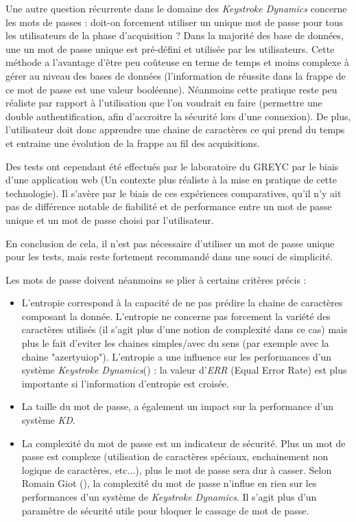 Une autre question récurrente dans le domaine des \textit{Keystroke Dynamics} concerne les mots de passes : doit-on forcement utiliser un unique mot de passe pour tous les utilisateurs de la phase d'acquisition ? Dans la majorité des base de données, une un mot de passe unique est pré-défini et utilisée par les utilisateurs. Cette méthode a l'avantage d'être peu coûteuse en terme de temps et moins complexe à gérer au niveau des bases de données (l'information de réussite dans la frappe de ce mot de passe est une valeur booléenne). Néanmoins cette pratique reste peu réaliste par rapport à l'utilisation que l'on voudrait en faire (permettre une double authentification, afin d'accroitre la sécurité lors d'une connexion). De plus, l'utilisateur doit donc apprendre une chaine de caractères ce qui prend du temps et entraine une évolution de la frappe au fil des acquisitions.

Des tests ont cependant été effectués par le laboratoire du GREYC\cite{giotWeb} par le biais d'une application web (Un contexte plus réaliste à la mise en pratique de cette technologie). Il s'avère par le biais de ces expériences comparatives, qu'il n'y ait pas de différence notable de fiabilité et de performance entre un mot de passe unique et un mot de passe choisi par l'utilisateur.

En conclusion de cela, il n'est pas nécessaire d'utiliser un mot de passe unique pour les tests, mais reste fortement recommandé dans une souci de simplicité.

Les mots de passe doivent néanmoins se plier à certains critères précis :

\begin{itemize}
\item L'entropie correspond à la capacité de ne pas prédire la chaine de caractères composant la donnée. L'entropie ne concerne pas forcement la variété des caractères utilisés (il s'agit plus d'une notion de complexité dans ce cas) mais plus le fait d'eviter les chaines simples/avec du sens (par exemple avec la chaine "azertyuiop"). L'entropie a une influence sur les performances d'un système \textit{Keystroke Dynamics}(\cite{giotWeb}) : la valeur d'\textit{ERR} (Equal Error Rate) est plus importante si l'information d'entropie est croisée.

\item La taille du mot de passe, a également un impact sur la performance d'un système \textit{KD}.

\item La complexité du mot de passe est un indicateur de sécurité. Plus un mot de passe est complexe (utilisation de caractères spéciaux, enchainement non logique de caractères, etc...), plus le mot de passe sera dur à casser. Selon Romain Giot (\cite{giotWeb}), la complexité du mot de passe n'influe en rien sur les performances d'un système de \textit{Keystroke Dynamics}. Il s'agit plus d'un paramètre de sécurité utile pour bloquer le cassage de mot de passe.

\end{itemize}

